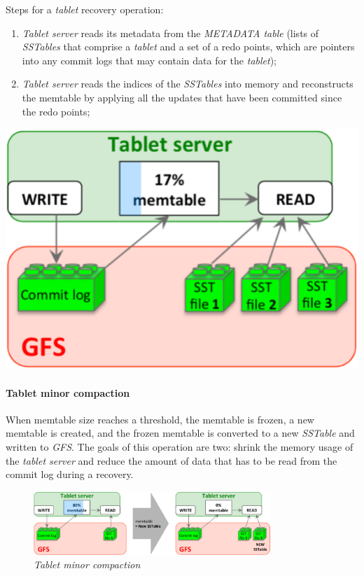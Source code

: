 \bigskip\noindent\begin{minipage}[c]{0.65\textwidth}
    Steps for a \emph{tablet} recovery operation:
    \begin{enumerate}
        \item \emph{Tablet server} reads its metadata from the \emph{METADATA
        table} (lists of \emph{SSTables} that comprise a \emph{tablet} and        a set of a redo points, which are
        pointers into any commit logs that may contain data for the \emph{tablet});
        \item \emph{Tablet server} reads the indices of the \emph{SSTables}
        into memory and reconstructs the memtable by applying all the updates
        that have been committed since the redo points;
    \end{enumerate}
\end{minipage}\hfill
\begin{minipage}[c]{0.33\textwidth}
    \includegraphics[width=\textwidth]{images/gbt-tablet-recovery.png}
\end{minipage}

\paragraph{Tablet minor compaction}
When memtable size reaches a threshold, the memtable is frozen, a new memtable
is created, and the frozen memtable is converted to a new \emph{SSTable} and
written to \emph{GFS}. The goals of this operation are two: shrink the memory
usage of the \emph{tablet server} and reduce the amount of data that has to be
read from the commit log during a recovery.

\begin{figure}[h!]
    \centering
    \includegraphics[width=0.8\textwidth]{images/gbt-tablet-minor-comp.png}
    \caption{\emph{Tablet minor compaction}}
\end{figure}

